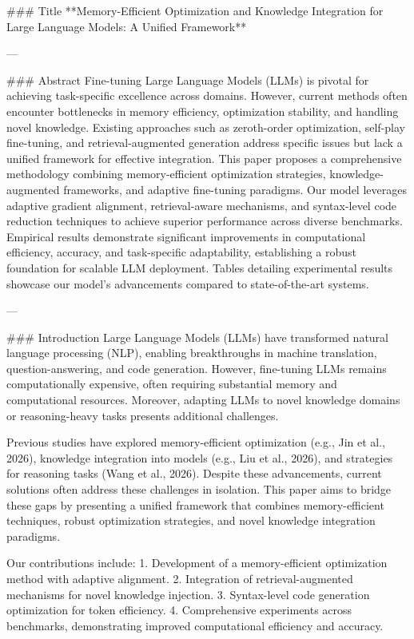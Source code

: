 ### Title  
**Memory-Efficient Optimization and Knowledge Integration for Large Language Models: A Unified Framework**

---

### Abstract  
Fine-tuning Large Language Models (LLMs) is pivotal for achieving task-specific excellence across domains. However, current methods often encounter bottlenecks in memory efficiency, optimization stability, and handling novel knowledge. Existing approaches such as zeroth-order optimization, self-play fine-tuning, and retrieval-augmented generation address specific issues but lack a unified framework for effective integration. This paper proposes a comprehensive methodology combining memory-efficient optimization strategies, knowledge-augmented frameworks, and adaptive fine-tuning paradigms. Our model leverages adaptive gradient alignment, retrieval-aware mechanisms, and syntax-level code reduction techniques to achieve superior performance across diverse benchmarks. Empirical results demonstrate significant improvements in computational efficiency, accuracy, and task-specific adaptability, establishing a robust foundation for scalable LLM deployment. Tables detailing experimental results showcase our model's advancements compared to state-of-the-art systems.

---

### Introduction  
Large Language Models (LLMs) have transformed natural language processing (NLP), enabling breakthroughs in machine translation, question-answering, and code generation. However, fine-tuning LLMs remains computationally expensive, often requiring substantial memory and computational resources. Moreover, adapting LLMs to novel knowledge domains or reasoning-heavy tasks presents additional challenges.  

Previous studies have explored memory-efficient optimization (e.g., Jin et al., 2026), knowledge integration into models (e.g., Liu et al., 2026), and strategies for reasoning tasks (Wang et al., 2026). Despite these advancements, current solutions often address these challenges in isolation. This paper aims to bridge these gaps by presenting a unified framework that combines memory-efficient techniques, robust optimization strategies, and novel knowledge integration paradigms.  

Our contributions include:  
1. Development of a memory-efficient optimization method with adaptive alignment.  
2. Integration of retrieval-augmented mechanisms for novel knowledge injection.  
3. Syntax-level code generation optimization for token efficiency.  
4. Comprehensive experiments across benchmarks, demonstrating improved computational efficiency and accuracy.  

